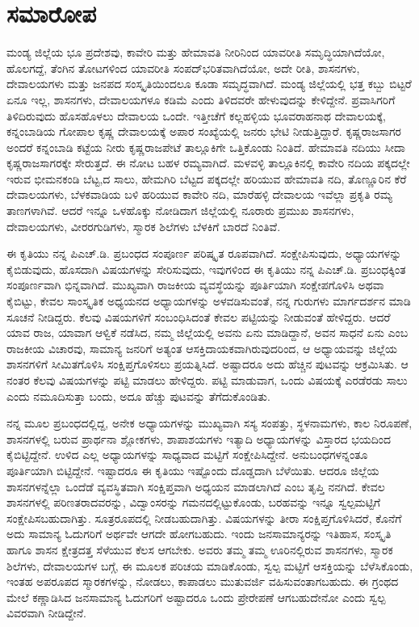 \chapter*{ಸಮಾರೋಪ}

ಮಂಡ್ಯ ಜಿಲ್ಲೆಯ ಭೂ ಪ್ರದೇಶವು, ಕಾವೇರಿ ಮತ್ತು ಹೇಮಾವತಿ ನೀರಿನಿಂದ ಯಾವರೀತಿ ಸಮೃದ್ಧಿಯಾಗಿದೆಯೋ, ಹೊಲಗದ್ದೆ, ತೆಂಗಿನ ತೋಟಗಳಿಂದ ಯಾವರೀತಿ ಸಂಪದ್​ಭರಿತವಾಗಿದೆಯೋ, ಅದೇ ರೀತಿ, ಶಾಸನಗಳು, ದೇವಾಲಯಗಳು ಮತ್ತು ಜನಪದ ಸಂಸ್ಕೃತಿಯಿಂದಲೂ ಕೂಡಾ ಸಮೃದ್ಧವಾಗಿದೆ. ಮಂಡ್ಯ ಜಿಲ್ಲೆಯಲ್ಲಿ ಭತ್ತ ಕಬ್ಬು ಬಿಟ್ಟರೆ ಏನೂ ಇಲ್ಲ, ಶಾಸನಗಳು, ದೇವಾಲಯಗಳೂ ಕಡಿಮೆ ಎಂದು ತಿಳಿದವರೇ ಹೇಳುವುದನ್ನು ಕೇಳಿದ್ದೇನೆ. ಪ್ರವಾಸಿಗರಿಗೆ ತಿಳಿದಿರುವುದು ಹೊಸಹೊಳಲು ದೇವಾಲಯ ಒಂದೇ. ಇತ್ತೀಚೆಗೆ ಕಲ್ಲಹಳ್ಳಿಯ ಭೂವರಾಹನಾಥ ದೇವಾಲಯಕ್ಕೆ, ಕನ್ನಂಬಾಡಿಯ ಗೋಪಾಲ ಕೃಷ್ಣ ದೇವಾಲಯಕ್ಕೆ ಅಪಾರ ಸಂಖ್ಯೆಯಲ್ಲಿ ಜನರು ಭೇಟಿ ನೀಡುತ್ತಿದ್ದಾರೆ. ಕೃಷ್ಣರಾಜಸಾಗರ ಅಂದರೆ ಕನ್ನಂಬಾಡಿ ಕಟ್ಟೆಯ ನೀರು ಕೃಷ್ಣರಾಜಪೇಟೆ ತಾಲ್ಲೂಕಿಗೇ ಒತ್ತಿಕೊಂಡು ನಿಂತಿದೆ. ಹೇಮಾವತಿ ನದಿಯು ಸೀದಾ ಕೃಷ್ಣರಾಜಸಾಗರಕ್ಕೇ ಸೇರುತ್ತದೆ. ಈ ನೋಟ ಬಹಳ ರಮ್ಯವಾಗಿದೆ. ಮಳವಳ್ಳಿ ತಾಲ್ಲೂಕಿನಲ್ಲಿ ಕಾವೇರಿ ನದಿಯ ಪಕ್ಕದಲ್ಲೇ ಇರುವ ಭೀಮನಕಂಡಿ ಬೆಟ್ಟ,ದ ಸಾಲು, ಹೇಮಗಿರಿ ಬೆಟ್ಟದ ಪಕ್ಕದಲ್ಲೇ ಹರಿಯುವ ಹೇಮಾವತಿ ನದಿ, ತೊಣ್ಣೂರಿನ ಕೆರೆ ದೇವಾಲಯಗಳು, ಬೆಳಕವಾಡಿಯ ಬಳಿ ಹರಿಯುವ ಕಾವೇರಿ ನದಿ, ಮಾರೆಹಳ್ಳಿ ದೇವಾಲಯ ಇವೆಲ್ಲಾ ಪ್ರಕೃತಿ ರಮ್ಯ ತಾಣಗಳಾಗಿವೆ. ಆದರೆ ಇನ್ನೂ ಒಳಹೊಕ್ಕು ನೋಡಿದಾಗ ಜಿಲ್ಲೆಯಲ್ಲಿ ನೂರಾರು ಪ್ರಮುಖ ಶಾಸನಗಳು, ದೇವಾಲಯಗಳು, ವೀರರಗುಡಿಗಳು, ಸ್ಮಾರಕ ಶಿಲೆಗಳು ಬೆಳಕಿಗೆ ಬಾರದೆ ನಿಂತಿವೆ.

ಈ ಕೃತಿಯು ನನ್ನ ಪಿಎಚ್​.ಡಿ. ಪ್ರಬಂಧದ ಸಂಪೂರ್ಣ ಪರಿಷ್ಕೃತ ರೂಪವಾಗಿದೆ. ಸಂಕ್ಷೇಪಿಸುವುದು, ಅಧ್ಯಾಯಗಳನ್ನು ಕೈಬಿಡುವುದು, ಹೊಸದಾಗಿ ವಿಷಯಗಳನ್ನು ಸೇರಿಸುವುದು, ಇವುಗಳಿಂದ ಈ ಕೃತಿಯು ನನ್ನ ಪಿಎಚ್​.ಡಿ. ಪ್ರಬಂಧಕ್ಕಿಂತ ಸಂಪೂರ್ಣವಾಗಿ ಭಿನ್ನವಾಗಿದೆ. ಮುಖ್ಯವಾಗಿ ರಾಜಕೀಯ ವ್ಯವಸ್ಥೆಯನ್ನು ಪೂರ್ತಿಯಾಗಿ ಸಂಕ್ಷೇಪಗೊಳಿಸಿ ಅಥವಾ ಕೈಬಿಟ್ಟು, ಕೇವಲ ಸಾಂಸ್ಕೃತಿಕ ಅಧ್ಯಯನದ ಅಧ್ಯಾಯಗಳನ್ನು ಅಳವಡಿಸುವಂತೆ, ನನ್ನ ಗುರುಗಳು ಮಾರ್ಗದರ್ಶನ ಮಾಡಿ ಸೂಚನೆ ನೀಡಿದ್ದರು. ಕೆಲವು ವಿಷಯಗಳಿಗೆ ಸಂಬಂಧಿಸಿದಂತೆ ಕೇವಲ ಪಟ್ಟಿಯನ್ನು ನೀಡುವಂತೆ ಹೇಳಿದ್ದರು. ಆದರೆ ಯಾವ ರಾಜ, ಯಾವಾಗ ಆಳ್ವಿಕೆ ನಡೆಸಿದ, ನಮ್ಮ ಜಿಲ್ಲೆಯಲ್ಲಿ ಅವನು ಏನು ಮಾಡಿದ್ದಾನೆ, ಅವನ ಸಾಧನೆ ಏನು ಎಂಬ ರಾಜಕೀಯ ವಿಚಾರವು, ಸಾಮಾನ್ಯ ಜನರಿಗೆ ಅತ್ಯಂತ ಆಸಕ್ತಿದಾಯಕವಾಗಿರುವುದರಿಂದ, ಆ ಅಧ್ಯಾಯವನ್ನು ಜಿಲ್ಲೆಯ ಶಾಸನಗಳಿಗೆ ಸೀಮಿತಗೊಳಿಸಿ ಸಂಕ್ಷಿಪ್ತಗೊಳಿಸಲು ಪ್ರಯತ್ನಿಸಿದೆ. ಅಷ್ಟಾದರೂ ಅದು ಹೆಚ್ಚಿನ ಪುಟವನ್ನು ಆಕ್ರಮಿಸಿತು. ಆ ನಂತರ ಕೆಲವು ವಿಷಯಗಳನ್ನು ಪಟ್ಟಿ ಮಾಡಲು ಹೇಳಿದ್ದರು. ಪಟ್ಟಿ ಮಾಡುವಾಗ, ಒಂದು ವಿಷಯಕ್ಕೆ ಎರಡೆರಡು ಸಾಲು ಎಂದು ನಮೂದಿಸುತ್ತಾ ಬಂದು, ಅದೂ ಹೆಚ್ಚು ಪುಟವನ್ನು ತೆಗೆದುಕೊಂಡಿತು.

ನನ್ನ ಮೂಲ ಪ್ರಬಂಧದಲ್ಲಿದ್ದ, ಅನೇಕ ಅಧ್ಯಾಯಗಳನ್ನು ಮುಖ್ಯವಾಗಿ ಸಸ್ಯ ಸಂಪತ್ತು, ಸ್ಥಳನಾಮಗಳು, ಕಾಲ ನಿರೂಪಣೆ, ಶಾಸನಗಳಲ್ಲಿ ಬರುವ ಪ್ರಾರ್ಥನಾ ಶ್ಲೋಕಗಳು, ಶಾಪಾಶಯಗಳು ಇತ್ಯಾದಿ ಅಧ್ಯಾಯಗಳನ್ನು ವಿಸ್ತಾರದ ಭಯದಿಂದ ಕೈಬಿಟ್ಟಿದ್ದೇನೆ. ಉಳಿದ ಎಲ್ಲ ಅಧ್ಯಾಯಗಳನ್ನು ಸಾಧ್ಯವಾದ ಮಟ್ಟಿಗೆ ಸಂಕ್ಷೇಪಿಸಿದ್ದೇನೆ. ಅನುಬಂಧಗಳನ್ನಂತೂ ಪೂರ್ತಿಯಾಗಿ ಬಿಟ್ಟಿದ್ದೇನೆ. ಇಷ್ಟಾದರೂ ಈ ಕೃತಿಯು ಇಷ್ಟೊಂದು ದೊಡ್ಡದಾಗಿ ಬೆಳೆಯಿತು. ಆದರೂ ಜಿಲ್ಲೆಯ ಶಾಸನಗಳನ್ನೆಲ್ಲಾ ಒಂದೆಡೆ ವ್ಯವಸ್ಥಿತವಾಗಿ ಸಂಕ್ಷಿಪ್ತವಾಗಿ ಅಧ್ಯಯನ ಮಾಡಲಾಗಿದೆ ಎಂಬ ತೃಪ್ತಿ ನನಗಿದೆ. ಕೇವಲ ಶಾಸನಗಳಲ್ಲಿ ಪರಿಣತರಾದವರನ್ನು, ವಿದ್ವಾಂಸರನ್ನು ಗಮನದಲ್ಲಿಟ್ಟುಕೊಂಡು, ಬರಹವನ್ನು ಇನ್ನೂ ಸ್ವಲ್ಪಮಟ್ಟಿಗೆ ಸಂಕ್ಷೇಪಿಸಬಹುದಾಗಿತ್ತು. ಸೂತ್ರರೂಪದಲ್ಲಿ ನೀಡಬಹುದಾಗಿತ್ತು. ವಿಷಯಗಳನ್ನು ತೀರಾ ಸಂಕ್ಷಿಪ್ತಗೊಳಿಸಿದರೆ, ಕೊನೆಗೆ ಅದು ಸಾಮಾನ್ಯ ಓದುಗರಿಗೆ ಅರ್ಥವೇ ಆಗದೇ ಹೋಗಬಹುದು. ಇಂದು ಜನಸಾಮಾನ್ಯರನ್ನು ಇತಿಹಾಸ, ಸಂಸ್ಕೃತಿ ಹಾಗೂ ಶಾಸನ ಕ್ಷೇತ್ರದತ್ತ ಸೆಳೆಯುವ ಕೆಲಸ ಆಗಬೇಕು. ಅವರು ತಮ್ಮ ತಮ್ಮ ಊರಿನಲ್ಲಿರುವ ಶಾಸನಗಳು, ಸ್ಮಾರಕ ಶಿಲೆಗಳು, ದೇವಾಲಯಗಳ ಬಗ್ಗೆ, ಈ ಮೂಲಕ ಪರಿಚಯ ಮಾಡಿಕೊಂಡು, ಸ್ವಲ್ಪ ಮಟ್ಟಿಗೆ ಆಸಕ್ತಿಯನ್ನು ಬೆಳೆಸಿಕೊಂಡು, ಇಂತಹ ಅಪರೂಪದ ಸ್ಮಾರಕಗಳನ್ನು, ನೋಡಲು, ಕಾಪಾಡಲು ಮುತುವರ್ಜಿ ವಹಿಸುವಂತಾಗಬಹುದು. ಈ ಗ್ರಂಥದ ಮೇಲೆ ಕಣ್ಣಾಡಿಸಿದ ಜನಸಾಮಾನ್ಯ ಓದುಗರಿಗೆ ಅಷ್ಟಾದರೂ ಒಂದು ಪ್ರೇರೇಪಣೆ ಆಗಬಹುದೇನೋ ಎಂದು ಸ್ವಲ್ಪ ವಿವರವಾಗಿ ನೀಡಿದ್ದೇನೆ.

